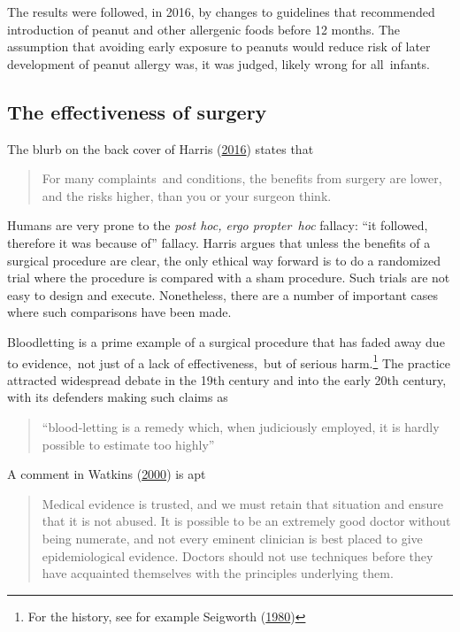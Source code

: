 \documentclass[
  10pt,
  b5paper]{book}
\begin{document}
The results were followed, in 2016, by changes to guidelines that
recommended introduction of peanut and other allergenic foods before 12
months. The assumption that avoiding early exposure to peanuts would
reduce risk of later development of peanut allergy was, it was judged,
likely wrong for all~infants.

\hypertarget{the-effectiveness-of-surgery}{%
\subsection{The effectiveness of surgery}\label{the-effectiveness-of-surgery}}

The blurb on the back cover of Harris (\protect\hyperlink{ref-harris2016book}{2016}) states that

\begin{quote}
For many complaints~and conditions, the benefits from surgery are
lower, and the risks higher, than you or your surgeon think.
\end{quote}

Humans are very prone to the \emph{post hoc, ergo propter~hoc} fallacy: ``it
followed, therefore it was because of'' fallacy. Harris argues that
unless the benefits of a surgical procedure are clear, the only ethical
way forward is to do a randomized trial where the procedure is compared
with a sham procedure. Such trials are not easy to design and execute.
Nonetheless, there are a number of important cases where such
comparisons have been made.

Bloodletting is a prime example of a surgical procedure that has faded
away due to evidence,~not just of a lack of effectiveness,~but of
serious harm.\footnote{For the history, see for example
  Seigworth (\protect\hyperlink{ref-seigworth1980bloodletting}{1980})} The practice attracted widespread debate
in the 19th century and into the early 20th century, with its defenders
making such claims as

\begin{quote}
``blood-letting is a remedy which, when judiciously employed, it is
hardly possible to estimate too highly''
\end{quote}

A comment in Watkins (\protect\hyperlink{ref-watkins2000conviction}{2000}) is apt

\begin{quote}
Medical evidence is trusted, and we must retain that situation and
ensure that it is not abused. It is possible to be an extremely good
doctor without being numerate, and not every eminent clinician is best
placed to give epidemiological evidence. Doctors should not use
techniques before they have acquainted themselves with the principles
underlying them.
\end{quote}
\end{document}
